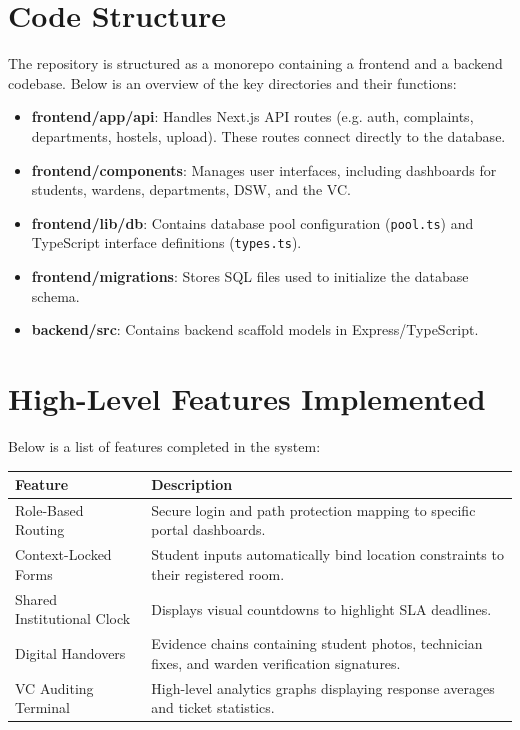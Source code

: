 \documentclass[12pt,a4paper]{article}
\begin{document}
\newpage
\section{Code Structure}
The repository is structured as a monorepo containing a frontend and a backend codebase. Below is an overview of the key directories and their functions:
\begin{itemize}
    \item \textbf{frontend/app/api}: Handles Next.js API routes (e.g. auth, complaints, departments, hostels, upload). These routes connect directly to the database.
    \item \textbf{frontend/components}: Manages user interfaces, including dashboards for students, wardens, departments, DSW, and the VC.
    \item \textbf{frontend/lib/db}: Contains database pool configuration (\texttt{pool.ts}) and TypeScript interface definitions (\texttt{types.ts}).
    \item \textbf{frontend/migrations}: Stores SQL files used to initialize the database schema.
    \item \textbf{backend/src}: Contains backend scaffold models in Express/TypeScript.
\end{itemize}

\newpage
\section{High-Level Features Implemented}
Below is a list of features completed in the system:

\begin{center}
\begin{tabular}{|l|p{10cm}|}
\hline
\textbf{Feature} & \textbf{Description} \\ \hline
Role-Based Routing & Secure login and path protection mapping to specific portal dashboards. \\ \hline
Context-Locked Forms & Student inputs automatically bind location constraints to their registered room. \\ \hline
Shared Institutional Clock & Displays visual countdowns to highlight SLA deadlines. \\ \hline
Digital Handovers & Evidence chains containing student photos, technician fixes, and warden verification signatures. \\ \hline
VC Auditing Terminal & High-level analytics graphs displaying response averages and ticket statistics. \\ \hline
\end{tabular}
\end{center}
\end{document}
